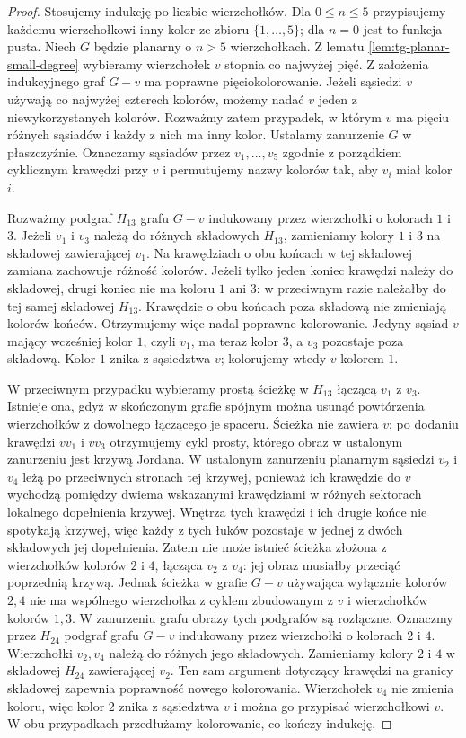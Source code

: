 \begin{proof}
Stosujemy indukcję po liczbie wierzchołków. Dla
$0\le n\le5$ przypisujemy każdemu wierzchołkowi
inny kolor ze zbioru $\{1,\ldots,5\}$; dla $n=0$
jest to funkcja pusta. Niech $G$
będzie planarny o $n>5$ wierzchołkach. Z lematu
\ref{lem:tg-planar-small-degree} wybieramy
wierzchołek $v$ stopnia co najwyżej pięć. Z założenia
indukcyjnego graf $G-v$ ma poprawne pięciokolorowanie.
Jeżeli sąsiedzi $v$ używają co najwyżej czterech kolorów,
możemy nadać $v$ jeden z niewykorzystanych kolorów.
Rozważmy zatem przypadek, w którym $v$ ma pięciu
różnych sąsiadów i każdy z nich ma inny kolor.
Ustalamy zanurzenie $G$ w płaszczyźnie. Oznaczamy
sąsiadów przez $v_1,\ldots,v_5$ zgodnie z porządkiem
cyklicznym krawędzi przy $v$ i permutujemy nazwy
kolorów tak, aby $v_i$ miał kolor $i$.

Rozważmy podgraf $H_{13}$ grafu $G-v$ indukowany przez
wierzchołki o kolorach $1$ i $3$. Jeżeli $v_1$ i $v_3$
należą do różnych składowych $H_{13}$, zamieniamy
kolory $1$ i $3$ na składowej zawierającej $v_1$.
Na krawędziach o obu końcach w tej składowej
zamiana zachowuje różność kolorów. Jeżeli tylko jeden
koniec krawędzi należy do składowej, drugi koniec
nie ma koloru $1$ ani $3$: w przeciwnym razie należałby
do tej samej składowej $H_{13}$. Krawędzie o obu końcach
poza składową nie zmieniają kolorów końców.
Otrzymujemy więc nadal poprawne kolorowanie.
Jedyny sąsiad $v$ mający wcześniej kolor $1$, czyli
$v_1$, ma teraz kolor $3$, a $v_3$ pozostaje poza
składową. Kolor $1$ znika z sąsiedztwa $v$;
kolorujemy wtedy $v$ kolorem $1$.

W przeciwnym przypadku wybieramy prostą ścieżkę
w $H_{13}$ łączącą $v_1$ z $v_3$. Istnieje ona, gdyż
w skończonym grafie spójnym można usunąć powtórzenia
wierzchołków z dowolnego łączącego je spaceru.
Ścieżka nie zawiera $v$; po dodaniu krawędzi
$vv_1$ i $vv_3$ otrzymujemy cykl prosty, którego obraz
w ustalonym zanurzeniu jest krzywą Jordana.
W ustalonym zanurzeniu planarnym sąsiedzi $v_2$ i $v_4$
leżą po przeciwnych stronach tej krzywej, ponieważ
ich krawędzie do $v$ wychodzą pomiędzy dwiema wskazanymi
krawędziami w różnych sektorach lokalnego dopełnienia
krzywej. Wnętrza tych krawędzi i ich drugie końce
nie spotykają krzywej, więc każdy z tych łuków
pozostaje w jednej z dwóch składowych jej dopełnienia.
Zatem nie może istnieć ścieżka złożona z wierzchołków
kolorów $2$ i $4$, łącząca $v_2$ z $v_4$:
jej obraz musiałby przeciąć poprzednią krzywą.
Jednak ścieżka w grafie $G-v$ używająca wyłącznie
kolorów $2,4$ nie ma wspólnego wierzchołka z cyklem
zbudowanym z $v$ i wierzchołków kolorów $1,3$.
W zanurzeniu grafu obrazy tych podgrafów są rozłączne.
Oznaczmy przez $H_{24}$ podgraf grafu $G-v$ indukowany
przez wierzchołki o kolorach $2$ i $4$. Wierzchołki
$v_2,v_4$ należą do różnych jego składowych.
Zamieniamy kolory $2$ i $4$ w składowej $H_{24}$
zawierającej $v_2$. Ten sam argument dotyczący
krawędzi na granicy składowej zapewnia poprawność
nowego kolorowania. Wierzchołek $v_4$ nie zmienia
koloru, więc kolor $2$ znika z sąsiedztwa $v$
i można go przypisać wierzchołkowi $v$.
W obu przypadkach przedłużamy kolorowanie, co kończy indukcję.
\end{proof}

